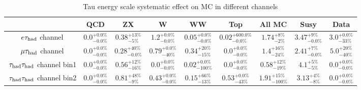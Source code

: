 \begin{table}[!h]
\tiny{
\begin{center}
\begin{tabular}{|c|c|c|c|c|c|c|c|c|}
\hline
                             & QCD & ZX    & W  & WW   & Top    & All MC & Susy & Data \\\hline 
$e\tau_{\rm had}$ channel           & $0.0 ^{+0.0 \%} _{-0.0 \%} $ & $0.38 ^{+13 \%} _{-5 \%}  $    &  $1.2 ^{+0.0 \%} _{-0.0 \%} $      &  $0.05 ^{+0.0 \%} _{-0.0 \%} $   &$0.02 ^{+600.0 \%} _{-0.0 \%} $           & $1.74 ^{+8 \%} _{-2 \%} $       & $3.47 ^{+9 \%} _{-0.0 \%} $ & $3.0 ^{+0.0 \%} _{-33 \%}$    \\\hline   

$\mu\tau_{\rm had}$ channel &  $0.0 ^{+0.0 \%} _{-0.0 \%} $     &  $0.28 ^{+40 \%} _{-0.0 \%} $      &  $0.79 ^{+0.0 \%} _{-40 \%} $  & $0.34 ^{+20 \%} _{-15 \%} $        &  $0.0 ^{+0.0 \%} _{-0.0 \%} $   &    $1.4 ^{+ 16 \%} _{- 24 \%} $      &  $2.41 ^{+7 \%} _{-0.0 \%} $      & $5.0 ^{+20 \%} _{-40 \%} $     \\\hline  

$\,\tau_{\rm had}\tau_{\rm had}$ channel bin1 &  $0.0 ^{+0.0 \%} _{-0.0 \%}$   &    $0.56 ^{+12 \%} _{-16 \%}$    &  $0.0 ^{+0.0 \%} _{-0.0 \%}$      &  $0.02 ^{+0.0 \%} _{-100 \%}$        &   $0.0 ^{+0.0 \%} _{-0.0 \%}$        &    $0.58 ^{+12 \%} _{-19 \%}$     & $4.1^{+5 \%} _{-5 \%} $    & $0.0 ^{+0.0 \%} _{-0.0 \%}$\\\hline

$\,\tau_{\rm had}\tau_{\rm had}$ channel bin2 &  $0.0 ^{+0.0 \%} _{-0.0 \%}$   &     $0.81 ^{+48 \%} _{-9 \%}$     &    $0.43 ^{+0.0 \%} _{-0.0 \%}$     &     $0.15 ^{+66 \%} _{-13 \%}$     &   $0.53 ^{+0.0 \%} _{-43 \%}$   &      $1.91 ^{+15 \%} _{-100 \%}$     &     $3.13 ^{+4 \%} _{-8 \%}$   &  $0.0 ^{+0.0 \%} _{-0.0 \%}$    \\\hline
\end{tabular} 
\end{center}
\caption{Tau energy scale systematic effect on MC in different channels}
\label{Tab.susyHiggs}
}
\end{table}     


